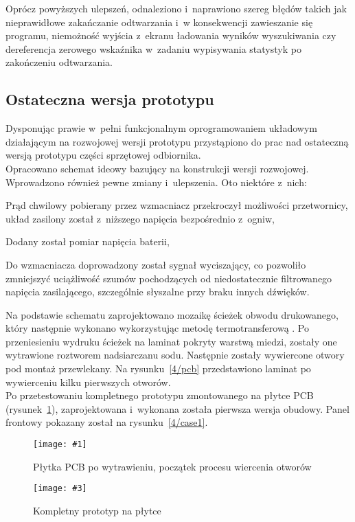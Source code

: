 \documentclass[polish]{aghengthesis}
\let\tempone\itemize
\let\temptwo\enditemize
\renewenvironment{itemize}{\tempone\setlength{\itemsep}{0cm}}{\temptwo}
\newcommand{\imgintss}[5]{
	\begin{figure}[{#5}]
		\centering
		\begin{minipage}{.45\textwidth}
			\centering
			\texttt{[image: \#1]}
			\caption{#2}
			\label{#1}
		\end{minipage}%
		\hfill
		\begin{minipage}{.45\textwidth}
			\centering
			\texttt{[image: \#3]}
			\caption{#4}
			\label{#3}
		\end{minipage}
	\end{figure}
}
\newcommand{\imghss}[4]{\imgintss{#1}{#2}{#3}{#4}{H}}
\begin{document}
			Oprócz powyższych ulepszeń, odnaleziono i~naprawiono szereg błędów takich jak nieprawidłowe zakańczanie odtwarzania i~w konsekwencji zawieszanie się programu, niemożność wyjścia z~ekranu ładowania wyników wyszukiwania czy dereferencja zerowego wskaźnika w~zadaniu wypisywania statystyk po zakończeniu odtwarzania.
			
		\subsection{Ostateczna wersja prototypu}
			Dysponując prawie w~pełni funkcjonalnym oprogramowaniem układowym działającym na rozwojowej wersji prototypu przystąpiono do prac nad ostateczną wersją prototypu części sprzętowej odbiornika.
			$ $\\
			
			Opracowano schemat ideowy bazujący na konstrukcji wersji rozwojowej. Wprowadzono również pewne  zmiany i~ulepszenia. Oto niektóre z~nich:
			\begin{itemize}
				\item Prąd chwilowy pobierany przez wzmacniacz przekroczył możliwości przetwornicy, układ zasilony został z~niższego napięcia bezpośrednio z~ogniw,
				\item Dodany został pomiar napięcia baterii,
				\item Do wzmacniacza doprowadzony został sygnał wyciszający, co pozwoliło zmniejszyć uciążliwość szumów pochodzących od niedostatecznie filtrowanego napięcia zasilającego, szczególnie słyszalne przy braku innych dźwięków.
			\end{itemize}
			
			Na podstawie schematu zaprojektowano mozaikę ścieżek obwodu drukowanego, który następnie wykonano wykorzystując metodę termotransferową \cite{ch4_pcb_method}.
			Po przeniesieniu wydruku ścieżek na laminat pokryty warstwą miedzi, zostały one wytrawione roztworem nadsiarczanu sodu. Następnie zostały wywiercone otwory pod montaż przewlekany. Na rysunku~\ref{4/pcb} przedstawiono laminat po wywierceniu kilku pierwszych otworów.
			$ $\\
			
			Po przetestowaniu kompletnego prototypu zmontowanego na płytce PCB (rysunek~\ref{4/prototype_3}), zaprojektowana i~wykonana została pierwsza wersja obudowy. Panel frontowy pokazany został na rysunku~\ref{4/case1}.

			\imghss{4/pcb}{Płytka PCB po wytrawieniu, początek procesu wiercenia otworów}{4/prototype_3}{Kompletny prototyp na płytce}
			
\end{document}
